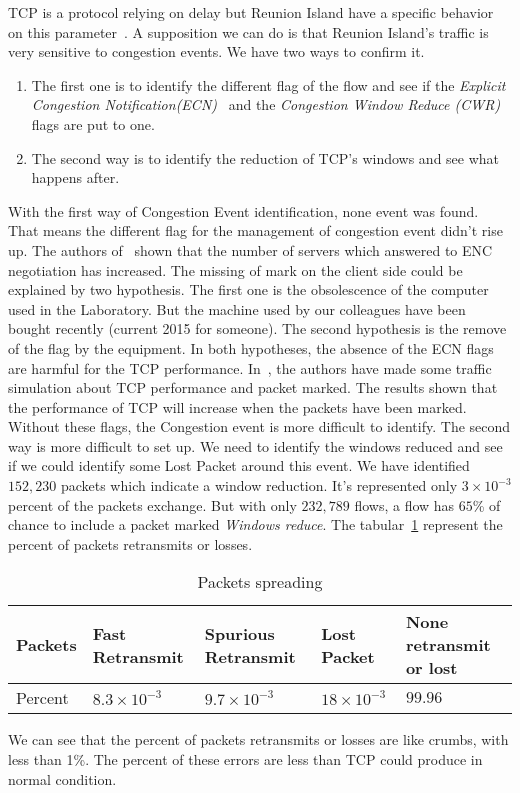 \documentclass[10pt, conference, a4paper, twocolumns]{IEEEtran}
\def\yassine#1{\textbf{\textcolor{blue}{yassine : #1}}}
\begin{document}
TCP is a protocol relying on delay but Reunion Island have a specific behavior on this parameter~\cite{Noordally2016}. A supposition we can do is that Reunion Island's traffic is very sensitive to congestion events. We have two ways to confirm it. %
\begin{enumerate}
\item The first one is to identify the different flag of the flow and see if the \emph{Explicit Congestion Notification(ECN)}~\cite{rfc3168} and the \emph{Congestion Window Reduce (CWR)} flags are put to one.
\item The second way is to identify the reduction of TCP's windows and see what happens after. 
\end{enumerate}
With the first way of Congestion Event identification, none event was found. That means the different flag for the management of congestion event didn't rise up. The authors of~\cite{trammell2015enabling} shown that the number of servers which answered to ENC negotiation has increased. The missing of mark on the client side could be explained by two hypothesis.
The first one is the obsolescence of the computer used in the Laboratory. But the machine used by our colleagues have been bought recently (current 2015 for someone). The second hypothesis is the remove of the flag by the equipment. 
In both hypotheses, the absence of the ECN flags are harmful for the TCP performance. In~\cite{mellia03}, the authors have made some traffic simulation about TCP performance and packet marked. The results shown that the performance of TCP will increase when the packets have been marked.
Without these flags, the Congestion event is more difficult to identify. 
The second way is more difficult to set up. We need to identify the windows reduced and see if we could identify some Lost Packet around this event. We have identified $152,230$ packets which indicate a window reduction. It's represented only $3\times10^{-3}$ percent of the packets exchange. But with only $232,789$ flows, a flow has $65$\% of chance to include a packet marked \emph{Windows reduce}.
The tabular~\ref{table:pkts} represent the percent of packets retransmits or losses.
\begin{table}[ht!]
\centering
\caption{Packets spreading}
\label{table:pkts}
\begin{tabular}{|p{}|p{}|p{}|p{}|p{}|}
\hline
Packets & Fast Retransmit & Spurious Retransmit & Lost Packet & None retransmit or lost \\ 
\hline
Percent & $8.3\times10^{-3}$ & $9.7\times10^{-3}$ & $18\times10^{-3}$ & $99.96$ \\ 
\hline
\end{tabular}
\end{table}
We can see that the percent of packets retransmits or losses are like crumbs, with less than 1\%. The percent of these errors are less than TCP could produce in normal condition.
\end{document}
